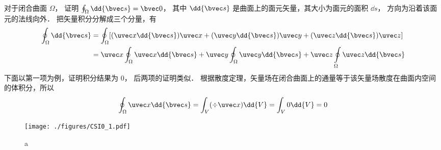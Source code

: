 

对于闭合曲面 $\Omega$，  证明 $\oint_\Omega  \dd{\bvec s} = \bvec 0$， 其中 $\dd{\bvec s}$ 是曲面上的面元矢量，其大小为面元的面积 $\dd{s}$，  方向为沿着该面元的法线向外．
把矢量积分分解成三个分量，有
\begin{equation}
\begin{aligned}
\oint_\Omega  \dd{\bvec s} & = \oint_\Omega  [(\uvec x \dd{\bvec s})\uvec x + (\uvec y \dd{\bvec s})\uvec y + (\uvec z \dd{\bvec s})\uvec z] \\
&= \uvec x\oint_\Omega  \uvec x \dd{\bvec s}  + \uvec y\oint_\Omega \uvec y \dd{\bvec s} + \uvec z\oint\limits_\Omega \uvec z \dd{\bvec s}
\end{aligned}
\end{equation}
下面以第一项为例，证明积分结果为 0， 后两项的证明类似．
根据散度定理，矢量场在闭合曲面上的通量等于该矢量场散度在曲面内空间的体积分，所以
\begin{equation}
\oint_\Omega  \uvec x \dd{\bvec s}  = \int_V (\div \uvec x) \dd{V}  = \int_V 0 \dd{V}  = 0
\end{equation}
\begin{figure}[ht]
\centering
\texttt{[image: ./figures/CSI0\_1.pdf]}
\caption{a} \label{CSI0_fig1}
\end{figure}

 
 

